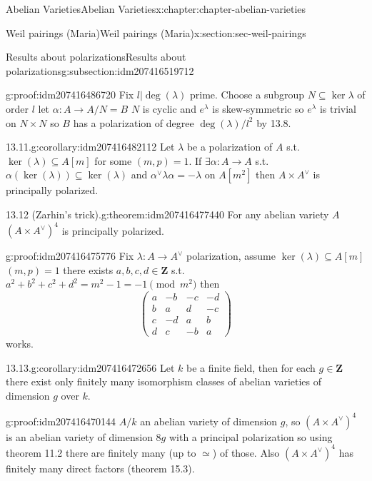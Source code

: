 \documentclass[oneside,10pt,]{book}
\numberwithin{equation}{section}
\newcommand{\lb}{[}
\newcommand{\rb}{]}
\newcommand{\ZZ}{\mathbf{Z}}
\newcommand{\amp}{&}
\begin{document}
\begin{chapterptx}{Abelian Varieties}{}{Abelian Varieties}{}{}{x:chapter:chapter-abelian-varieties}
\begin{sectionptx}{Weil pairings (Maria)}{}{Weil pairings (Maria)}{}{}{x:section:sec-weil-pairings}
\begin{subsectionptx}{Results about polarizations}{}{Results about polarizations}{}{}{g:subsection:idm207416519712}
\begin{proofptx}{}{g:proof:idm207416486720}
Fix \(l |\deg(\lambda)\) prime. Choose a subgroup \(N\subseteq \ker \lambda\) of order \(l\) let \(\alpha \colon A\to A/N = B\) \(N\) is cyclic and \(e^\lambda\) is skew-symmetric so \(e^{\lambda}\) is trivial on \(N\times N\) so \(B\) has a polarization of degree \(\deg(\lambda) / l^2\) by 13.8.%
\end{proofptx}
\begin{corollary}{13.11.}{}{g:corollary:idm207416482112}%
Let \(\lambda\) be a polarization of \(A\) s.t. \(\ker (\lambda) \subseteq A\lb m \rb\) for some \((m,p)=1\). If \(\exists \alpha \colon A \to A\) s.t. \(\alpha(\ker (\lambda)) \subseteq \ker(\lambda)\) and \(\alpha^\vee \lambda \alpha = - \lambda\) on \(A\lb m^2\rb\) then \(A\times A^\vee\) is principally polarized.%
\end{corollary}
\begin{theorem}{13.12 (Zarhin's trick).}{}{g:theorem:idm207416477440}%
For any abelian variety \(A\) \((A\times A^\vee)^4\) is principally polarized.%
\end{theorem}
\begin{proofptx}{}{g:proof:idm207416475776}
Fix \(\lambda \colon A\to A^\vee\) polarization, assume \(\ker (\lambda) \subseteq A\lb m \rb\) \((m, p) = 1\) there exists \(a,b,c,d \in \ZZ\) s.t. \(a^2 + b^2 + c^2 + d^2 = m^2  - 1 = -1 \pmod {m^2}\) then%
\begin{equation*}
\begin{pmatrix} a\amp -b \amp-c\amp -d \\ b\amp a \amp d \amp -c \\ c\amp -d \amp a \amp b \\ d \amp c \amp -b \amp a\end{pmatrix}
\end{equation*}
works.%
\end{proofptx}
\begin{corollary}{13.13.}{}{g:corollary:idm207416472656}%
Let \(k\) be a finite field, then for each \(g \in \ZZ\) there exist only finitely many isomorphism classes of abelian varieties of dimension \(g\) over \(k\).%
\end{corollary}
\begin{proofptx}{}{g:proof:idm207416470144}
\(A/k\) an abelian variety of dimension \(g\), so \((A\times A^\vee)^4\) is an abelian variety of dimension \(8g\) with a principal polarization so using theorem 11.2 there are finitely many (up to \(\simeq\)) of those. Also \((A\times A^\vee)^4\) has finitely many direct factors (theorem 15.3).%
\end{proofptx}

\end{subsectionptx}
\end{sectionptx}
\end{chapterptx}
\end{document}
